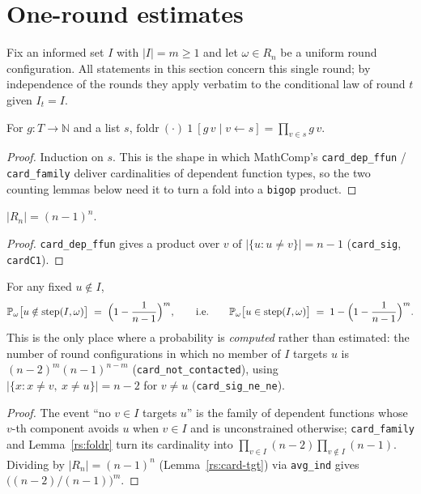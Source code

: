 \section{One-round estimates}\label{rs:sec:oneround}

Fix an informed set $I$ with $|I| = m \ge 1$ and let $\omega \in R_n$ be a
uniform round configuration. All statements in this section concern this
single round; by independence of the rounds they apply verbatim to the
conditional law of round $t$ given $I_t = I$.

\begin{lemma}\label{rs:foldr}
  \rocqok
  For $g \colon T \to \mathbb{N}$ and a list $s$,
  $\mathrm{foldr}\ (\cdot)\ 1\ [g\,v \mid v \leftarrow s] = \prod_{v \in s} g\,v$.
\end{lemma}
\begin{proof}
  \rocqok
  Induction on $s$. This is the shape in which MathComp's
  \texttt{card\_dep\_ffun} / \texttt{card\_family} deliver cardinalities of
  dependent function types, so the two counting lemmas below need it to
  turn a fold into a \texttt{bigop} product.
\end{proof}

\begin{lemma}\label{rs:card-tgt}
  \rocqok
  $|R_n| = (n-1)^n$.
\end{lemma}
\begin{proof}
  \rocqok
  \texttt{card\_dep\_ffun} gives a product over $v$ of
  $|\{u : u \ne v\}| = n - 1$ (\texttt{card\_sig}, \texttt{cardC1}).
\end{proof}

\begin{lemma}\label{rs:contact}
  \rocqok
  For any fixed $u \notin I$,
  \[
    \mathbb{P}_\omega\bigl[u \notin \mathrm{step}(I,\omega)\bigr]
    \;=\; \Bigl(1-\frac{1}{n-1}\Bigr)^{m},
    \qquad\text{i.e.}\qquad
    \mathbb{P}_\omega\bigl[u \in \mathrm{step}(I,\omega)\bigr]
    \;=\; 1 - \Bigl(1-\frac{1}{n-1}\Bigr)^{m}.
  \]
  This is the only place where a probability is \emph{computed}
  rather than estimated: the number of round configurations in which no
  member of $I$ targets $u$ is $(n-2)^{m}(n-1)^{n-m}$
  (\texttt{card\_not\_contacted}), using
  $|\{x : x \ne v,\ x \ne u\}| = n - 2$ for $v \ne u$
  (\texttt{card\_sig\_ne\_ne}).
\end{lemma}
\begin{proof}
  \rocqok
  The event ``no $v \in I$ targets $u$'' is the family of dependent
  functions whose $v$-th component avoids $u$ when $v \in I$ and is
  unconstrained otherwise; \texttt{card\_family} and Lemma~\ref{rs:foldr}
  turn its cardinality into $\prod_{v \in I}(n-2)\prod_{v \notin I}(n-1)$.
  Dividing by $|R_n| = (n-1)^n$ (Lemma~\ref{rs:card-tgt}) via
  \texttt{avg\_ind} gives $\bigl((n-2)/(n-1)\bigr)^m$.
\end{proof}

